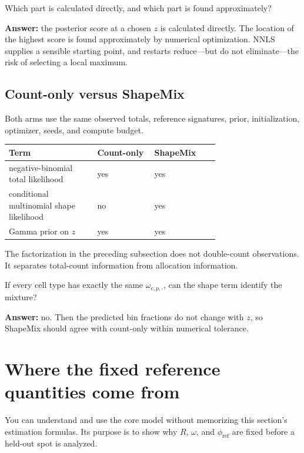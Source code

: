 \documentclass[11pt]{article}
\begin{document}
\begin{checkpoint}
Which part is calculated directly, and which part is found approximately?

\textbf{Answer:} the posterior score at a chosen \(z\) is calculated directly.
The location of the highest score is found approximately by numerical
optimization. NNLS supplies a sensible starting point, and restarts reduce---but
do not eliminate---the risk of selecting a local maximum.
\end{checkpoint}

\subsection{Count-only versus ShapeMix}

Both arms use the same observed totals, reference signatures, prior,
initialization, optimizer, seeds, and compute budget.

\begin{center}
\begin{tabular}{L{0.31\linewidth}C{0.20\linewidth}C{0.20\linewidth}}
\toprule
Term & Count-only & ShapeMix \\
\midrule
negative-binomial total likelihood & yes & yes \\
conditional multinomial shape likelihood & no & yes \\
Gamma prior on \(z\) & yes & yes \\
\bottomrule
\end{tabular}
\end{center}

The factorization in the preceding subsection does not double-count
observations. It separates total-count information from allocation information.

\begin{checkpoint}
If every cell type has exactly the same \(\omega_{c,p,\cdot}\), can the shape term
identify the mixture?

\textbf{Answer:} no. Then the predicted bin fractions do not change with \(z\),
so ShapeMix should agree with count-only within numerical tolerance.
\end{checkpoint}

\section{Where the fixed reference quantities come from}

You can understand and use the core model without memorizing this section's
estimation formulas. Its purpose is to show why \(R\), \(\omega\), and
\(\phi_{\mathrm{ref}}\) are fixed before a held-out spot is analyzed.
\end{document}
